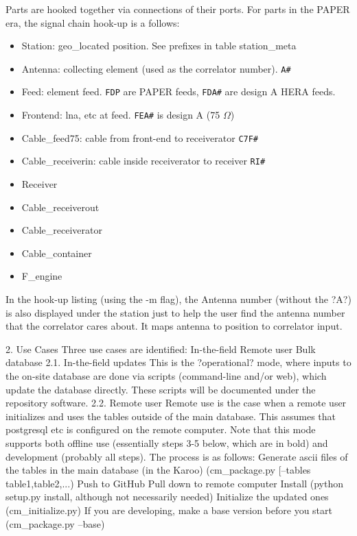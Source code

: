 \documentclass{article}
\begin{document}
Parts are hooked together via connections of their ports.   For parts in the PAPER era, the signal chain hook-up is a follows:
\begin{itemize}
\setlength\itemsep{-.3em}
	\item Station: geo\_located position.  See prefixes in table station\_meta
	\item Antenna:  collecting element (used as the correlator number).  {\tt A\#}
	\item Feed:  element feed.  {\tt FDP} are PAPER feeds, {\tt FDA\#} are design A HERA feeds.
	\item Frontend:  lna, etc at feed.  {\tt FEA\#} is design A (75 $\Omega$)
	\item Cable\_feed75:  cable from front-end to receiverator {\tt C7F\#}
	\item Cable\_receiverin:  cable inside receiverator to receiver {\tt RI\#}
	\item Receiver
	\item Cable\_receiverout
	\item Cable\_receiverator
	\item Cable\_container
	\item F\_engine
\end{itemize}

In the hook-up listing (using the -m flag), the Antenna number (without the ?A?) is also displayed under the station just to help the user find the antenna number that the correlator cares about.  It maps antenna to position to correlator input.


2. Use Cases
Three use cases are identified:
In-the-field
Remote user
Bulk database
2.1. In-the-field updates
This is the ?operational? mode, where inputs to the on-site database are done via scripts (command-line and/or web), which update the database directly.  These scripts will be documented under the repository software.
2.2. Remote user
Remote use is the case when a remote user initializes and uses the tables outside of the main database.  This assumes that postgresql etc is configured on the remote computer.  Note that this mode supports both offline use (essentially steps 3-5 below, which are in bold) and development (probably all steps).  The process is as follows: 
Generate ascii files of the tables in the main database (in the Karoo)
      	(cm\_package.py [--tables table1,table2,...)
Push to GitHub
Pull down to remote computer
Install (python setup.py install, although not necessarily needed)
Initialize the updated ones (cm\_initialize.py)
If you are developing, make a base version before you start
(cm\_package.py --base)
\end{document}
